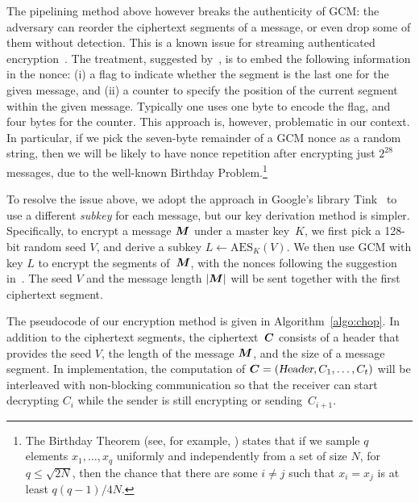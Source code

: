 The pipelining method above however breaks the authenticity of GCM:
the adversary can reorder the ciphertext segments of a message,
or even drop some of them without detection. This is a known issue for
streaming authenticated encryption~\cite{C:HRRV15}.
The treatment, suggested by~\cite{C:HRRV15},  is to embed the following
information in the nonce:
(i) a flag to indicate whether the segment is the last one
for the given message, and (ii) a counter to specify the position of the current segment
within the given message.
Typically one uses one byte to encode the flag, and four bytes for the counter.
This approach is, however, problematic in our context.
In particular, if we pick the seven-byte remainder of a GCM nonce as a random string,
then we will be likely to have nonce repetition after encrypting just $2^{28}$ messages,
due to the well-known Birthday Problem.\footnote{
The Birthday Theorem (see, for example, \cite[Appendix A.4]{Book:KL14}) states that
if we sample $q$
elements $x_1, \ldots, x_q$ uniformly and independently from a set of size $N$,
for $q \leq \sqrt{2N}$,
then the chance that there are some $i \ne j$ such that $x_i = x_j$ is at least
$q(q - 1) / 4N$.}

To resolve the issue above, we adopt the approach in Google's %
library Tink~\cite{tink} to use a different \emph{subkey} for each message, but our
key derivation method is simpler.
Specifically, to encrypt a message $\bm{M}$ under a master key~$K$,
we first pick a 128-bit random seed $V$, and derive a subkey $L \gets \mathrm{AES}_K(V)$.
We then use GCM with key $L$ to encrypt the segments of~$\bm{M}$,
with the nonces following the suggestion in~\cite{C:HRRV15}.
The seed $V$ and the message length $|\bm{M}|$ will be sent together with the first
ciphertext segment.

The pseudocode of our encryption method  is given in Algorithm~\ref{algo:chop}.
In addition to the ciphertext segments, the ciphertext~$\boldsymbol{C}$ consists of a header
that provides the seed $V$, the length of the message $\bm{M}$, and the size of a
message segment.
In implementation, the computation of $\boldsymbol{C} = (\textsl{Header}, C_1, \ldots, C_t)$
will be interleaved with non-blocking communication
so that the receiver can start decrypting $C_i$ while the sender is still encrypting
or sending~$C_{i + 1}$.
 
